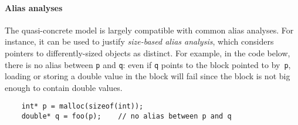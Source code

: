 


\paragraph{Alias analyses} The quasi-concrete model is largely
compatible with common alias analyses.  For instance, it can be used
to justify \textit{size-based alias analysis}, which considers
pointers to differently-sized objects as distinct. For example, in
the code below, there is no alias between \texttt{p} and \texttt{q}:
even if \texttt{q} points to the block
pointed to by~\texttt{p}, loading or storing a double value in the
block will fail since the block is not big enough to contain double
values.
\begin{center}
  \begin{verbatim}
    int* p = malloc(sizeof(int));
    double* q = foo(p);    // no alias between p and q
  \end{verbatim}
\end{center}

